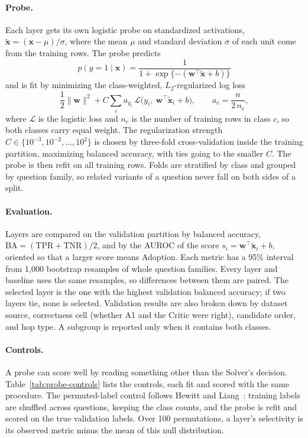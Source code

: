 \paragraph{Probe.} Each layer gets its own logistic probe on standardized
activations, $\tilde{\mathbf{x}} = (\mathbf{x} - \mu)/\sigma$, where the mean
$\mu$ and standard deviation $\sigma$ of each unit come from the training rows.
The probe predicts
\begin{equation}
  p(y = 1 \mid \mathbf{x}) =
  \frac{1}{1 + \exp\{-(\mathbf{w}^{\top}\tilde{\mathbf{x}} + b)\}}
  \label{eq:probe}
\end{equation}
and is fit by minimizing the class-weighted, $L_2$-regularized log loss
\begin{equation}
  \frac{1}{2}\|\mathbf{w}\|^{2}
  + C \sum_{i} a_{y_i}\,
  \mathcal{L}\bigl(y_i,\ \mathbf{w}^{\top}\tilde{\mathbf{x}}_i + b\bigr),
  \qquad a_c = \frac{n}{2\,n_c},
  \label{eq:probe-loss}
\end{equation}
where $\mathcal{L}$ is the logistic loss and $n_c$ is the number of training
rows in class $c$, so both classes carry equal weight. The regularization
strength $C \in \{10^{-3}, 10^{-2}, \ldots, 10^{2}\}$ is chosen by three-fold
cross-validation inside the training partition, maximizing balanced accuracy,
with ties going to the smaller $C$. The probe is then refit on all training
rows. Folds are stratified by class and grouped by question family, so related
variants of a question never fall on both sides of a split.

\paragraph{Evaluation.} Layers are compared on the validation partition by
balanced accuracy, $\mathrm{BA} = (\mathrm{TPR} + \mathrm{TNR})/2$, and by the
AUROC of the score $s_i = \mathbf{w}^{\top}\tilde{\mathbf{x}}_i + b$, oriented
so that a larger score means Adoption. Each metric has a 95\% interval from
1{,}000 bootstrap resamples of whole question families. Every layer and
baseline uses the same resamples, so differences between them are paired. The
selected layer is the one with the highest validation balanced accuracy; if two
layers tie, none is selected. Validation results are also broken down by
dataset source, correctness cell (whether A1 and the Critic were right),
candidate order, and hop type. A subgroup is reported only when it contains
both classes.

\paragraph{Controls.} A probe can score well by reading something other than
the Solver's decision. Table~\ref{tab:probe-controls} lists the controls, each
fit and scored with the same procedure. The permuted-label control follows
Hewitt and Liang~\cite{hewitt2019control}: training labels are shuffled across
questions, keeping the class counts, and the probe is refit and scored on the
true validation labels. Over 100 permutations, a layer's selectivity is its
observed metric minus the mean of this null distribution.

